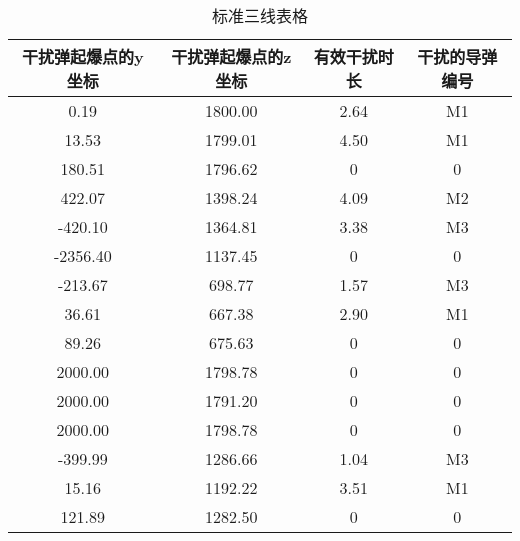 \documentclass[../main.tex]{subfiles}
\begin{document}
\begin{table}[H]
\caption{标准三线表格}
\label{tab:031} 
\centering
\begin{small}
\begin{tabular}{cccc}
\toprule[1.5pt]
干扰弹起爆点的y坐标&干扰弹起爆点的z坐标&有效干扰时长 &干扰的导弹编号\\
\midrule[1pt]
0.19    & 1800.00 & 2.64 & M1 \\
    13.53   & 1799.01 & 4.50 & M1 \\
    180.51  & 1796.62 & 0    & 0 \\
    422.07  & 1398.24 & 4.09 & M2 \\
    -420.10 & 1364.81 & 3.38 & M3 \\
    -2356.40& 1137.45 & 0    & 0 \\
    -213.67 & 698.77  & 1.57 & M3 \\
    36.61   & 667.38  & 2.90 & M1 \\
    89.26   & 675.63  & 0    & 0 \\
    2000.00 & 1798.78 & 0    & 0 \\
    2000.00 & 1791.20 & 0    & 0 \\
    2000.00 & 1798.78 & 0    & 0 \\
    -399.99 & 1286.66 & 1.04 & M3 \\
    15.16   & 1192.22 & 3.51 & M1 \\
    121.89  & 1282.50 & 0    & 0 \\             
\bottomrule[1.5pt]
\end{tabular}
\end{small}
\end{table}

\end{document}
